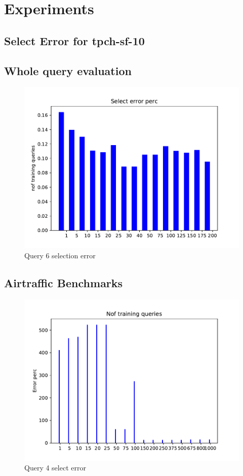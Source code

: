 \section{Experiments}
\subsection{Select Error for tpch-sf-10}

\subsection{Whole query evaluation}

\begin{figure}[ht]
  \centering
  \includegraphics[scale=0.7]{figs/select_error_q6.pdf}
  \caption{Query 6 selection error}
  \label{fig:sel6}
\end{figure}

\subsection{Airtraffic Benchmarks}
\begin{figure}[ht]
  \centering
  \includegraphics[scale=0.7]{figs/airtraffic/airtraffic_sel4_error.pdf}
  \caption{Query 4 select error}
  \label{fig:sel6}
\end{figure}

